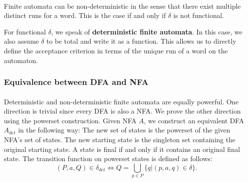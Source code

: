 \documentclass[11pt,a4paper,oneside]{book}
\begin{document}
                \paragraph{} 
                Finite automata can be non-deterministic in the sense that there exist multiple distinct runs for a word. This is the case if and only if $\delta$ is not functional. 



                For functional $\delta$, we speak of \textbf{deterministic finite automata}. In this case, we also assume $\delta$ to be total and write it as a function. 
                This allows us to directly define the acceptance criterion in terms of the unique run of a word on the automaton. 


                \subsubsection{Equivalence between DFA and NFA}
                    \paragraph{} 
                        Deterministic and non-deterministic finite automata are equally powerful. 
                        One direction is trivial since every DFA is also a NFA. 
                        We prove the other direction using the powerset construction. 
                        Given NFA $A$, we construct an equivalent DFA $A_{det}$ in the following way:
                        The new set of states is the powerset of the given NFA's set of states. 
                        The new starting state is the singleton set containing the original starting state. 
                        A state is final if and only if it contains an original final state. 
                        The transition function on powerset states is defined as follows:
                        \[
                            (P, a, Q) \in \delta_{det} \Longleftrightarrow Q = \bigcup \limits _{p \in P} \{ q | (p,a,q) \in \delta \}.
                        \]


                    \vspace{-0.4cm}
                    \vspace{-0.4cm}
\end{document}
